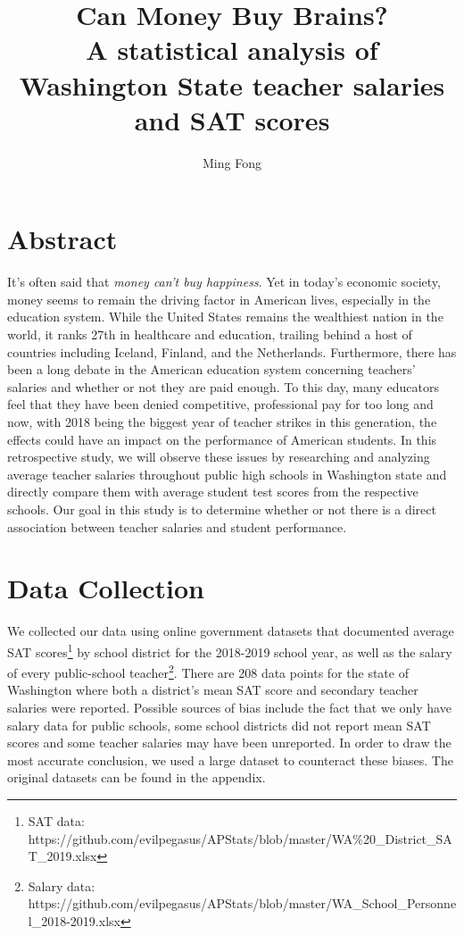 \documentclass[11pt]{article} %
\title{Can Money Buy Brains? \\
	\large A statistical analysis of Washington State teacher salaries and SAT scores}
\author{Ming Fong}
\begin{document}
\maketitle

\section{Abstract}

It’s often said that \textit{money can't buy happiness}. Yet in today’s economic society, money seems to remain the driving factor in American lives, especially in the education system. While the United States remains the wealthiest nation in the world, it ranks 27th in healthcare and education, trailing behind a host of countries including Iceland, Finland, and the Netherlands. Furthermore, there has been a long debate in the American education system concerning teachers’ salaries and whether or not they are paid enough. To this day, many educators feel that they have been denied competitive, professional pay for too long and now, with 2018 being the biggest year of teacher strikes in this generation, the effects could have an impact on the performance of American students. In this retrospective study, we will observe these issues by researching and analyzing average teacher salaries throughout public high schools in Washington state and directly compare them with average student test scores from the respective schools. Our goal in this study is to determine whether or not there is a direct association between teacher salaries and student performance.

\section{Data Collection}

We collected our data using online government datasets that documented average SAT scores\footnote{SAT data: https://github.com/evilpegasus/APStats/blob/master/WA\%20\_District\_SAT\_2019.xlsx} by school district for the 2018-2019 school year, as well as the salary of every public-school teacher\footnote{ Salary data: https://github.com/evilpegasus/APStats/blob/master/WA\_School\_Personnel\_2018-2019.xlsx}. There are 208 data points for the state of Washington where both a district's mean SAT score and secondary teacher salaries were reported. Possible sources of bias include the fact that we only have salary data for public schools, some school districts did not report mean SAT scores and some teacher salaries may have been unreported. In order to draw the most accurate conclusion, we used a large dataset to counteract these biases. The original datasets can be found in the appendix.
\end{document}
